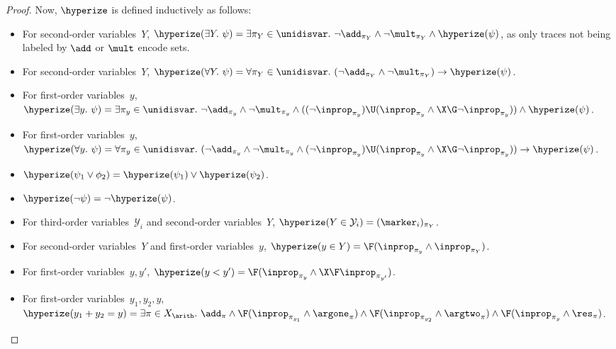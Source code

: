 \begin{proof}
Now, $\hyperize$ is defined inductively as follows: 
\begin{itemize}
    \item For second-order variables~$Y$, $\hyperize(\exists Y.\ \psi) = \exists \pi_Y \in \unidisvar.\ \neg\add_{\pi_Y} \wedge \neg\mult_{\pi_Y} \wedge \hyperize(\psi)$, as only traces not being labeled by $\add$ or $\mult$ encode sets.

    \item For second-order variables~$Y$, $\hyperize(\forall Y.\ \psi) = \forall \pi_Y \in \unidisvar.\ (\neg\add_{\pi_Y} \wedge \neg\mult_{\pi_Y}) \rightarrow \hyperize(\psi)$.

    \item For first-order variables~$y$, $\hyperize(\exists y.\ \psi) = \exists \pi_y \in \unidisvar.\ \neg\add_{\pi_y} \wedge \neg\mult_{\pi_y} \wedge ((\neg \inprop_{\pi_y})\U(\inprop_{\pi_y} \wedge \X\G\neg \inprop_{\pi_y})) \wedge \hyperize(\psi)$.

    \item For first-order variables~$y$, $\hyperize(\forall y.\ \psi) = \forall \pi_y \in \unidisvar.\ (\neg\add_{\pi_y} \wedge \neg\mult_{\pi_y} \wedge (\neg \inprop_{\pi_y})\U(\inprop_{\pi_y} \wedge \X\G\neg \inprop_{\pi_y})) \rightarrow \hyperize(\psi)$.

    \item $\hyperize(\psi_1 \lor \phi_2) = \hyperize(\psi_1) \lor \hyperize(\psi_2)$.
    
    \item $\hyperize(\lnot \psi) = \lnot \hyperize(\psi) $.

    \item For third-order variables~$\mathcal{Y}_i$ and second-order variables~$Y$, $\hyperize(Y\in \mathcal{Y}_i) = (\marker_i)_{\pi_Y}$.
    
    \item For second-order variables~$Y$ and first-order variables~$y$, $\hyperize(y\in Y) = \F(\inprop_{\pi_y} \land \inprop_{\pi_Y})$.
    
    \item For first-order variables~$y,y'$, $\hyperize(y<y') = \F(\inprop_{\pi_y} \land \X\F\inprop_{\pi_{y'}})$.
    
    \item For first-order variables~$y_1,y_2,y$, $\hyperize(y_1+y_2=y) = \exists \pi \in X_\arith.\ \add_\pi \land \F(\inprop_{\pi_{y_1}}\land\argone_\pi) \land \F(\inprop_{\pi_{y_2}}\land\argtwo_\pi) \land \F(\inprop_{\pi_y}\land\res_\pi)$.
    

\end{itemize}
\end{proof}
